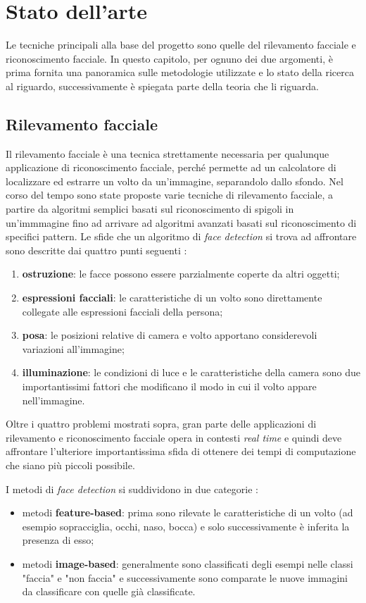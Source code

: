 \chapter{Stato dell'arte}
Le tecniche principali alla base del progetto sono quelle del rilevamento facciale e riconoscimento facciale. In questo capitolo, per ognuno dei due argomenti, è prima fornita una panoramica sulle metodologie utilizzate e lo stato della ricerca al riguardo, successivamente è spiegata parte della teoria che li riguarda.

\section{Rilevamento facciale}
Il rilevamento facciale è una tecnica strettamente necessaria per qualunque applicazione di riconoscimento facciale, perché permette ad un calcolatore di localizzare ed estrarre un volto da un'immagine, separandolo dallo sfondo. Nel corso del tempo sono state proposte varie tecniche di rilevamento facciale, a partire da algoritmi semplici basati sul riconoscimento di spigoli in un'immmagine fino ad arrivare ad algoritmi avanzati basati sul riconoscimento di specifici pattern. Le sfide che un algoritmo di \textit{face detection} si trova ad affrontare sono descritte dai quattro punti seguenti \cite{datta2015face}:
\begin{enumerate}
	\item \textbf{ostruzione}: le facce possono essere parzialmente coperte da altri oggetti;
	\item \textbf{espressioni facciali}: le caratteristiche di un volto sono direttamente collegate alle espressioni facciali della persona;
	\item \textbf{posa}: le posizioni relative di camera e volto apportano considerevoli variazioni all'immagine;
	\item \textbf{illuminazione}: le condizioni di luce e le caratteristiche della camera sono due importantissimi fattori che modificano il modo in cui il volto appare nell'immagine.
\end{enumerate}

Oltre i quattro problemi mostrati sopra, gran parte delle applicazioni di rilevamento e riconoscimento facciale opera in contesti \textit{real time} e quindi deve affrontare l'ulteriore importantissima sfida di ottenere dei tempi di computazione che siano più piccoli possibile.

I metodi di \textit{face detection} si suddividono in due categorie \cite{datta2015face}:
\begin{itemize}
	\item metodi \textbf{feature-based}: prima sono rilevate le caratteristiche di un volto (ad esempio sopracciglia, occhi, naso, bocca) e solo successivamente è inferita la presenza di esso;
	\item metodi \textbf{image-based}: generalmente sono classificati degli esempi nelle classi "faccia" e "non faccia" e successivamente sono comparate le nuove immagini da classificare con quelle già classificate.
\end{itemize}

